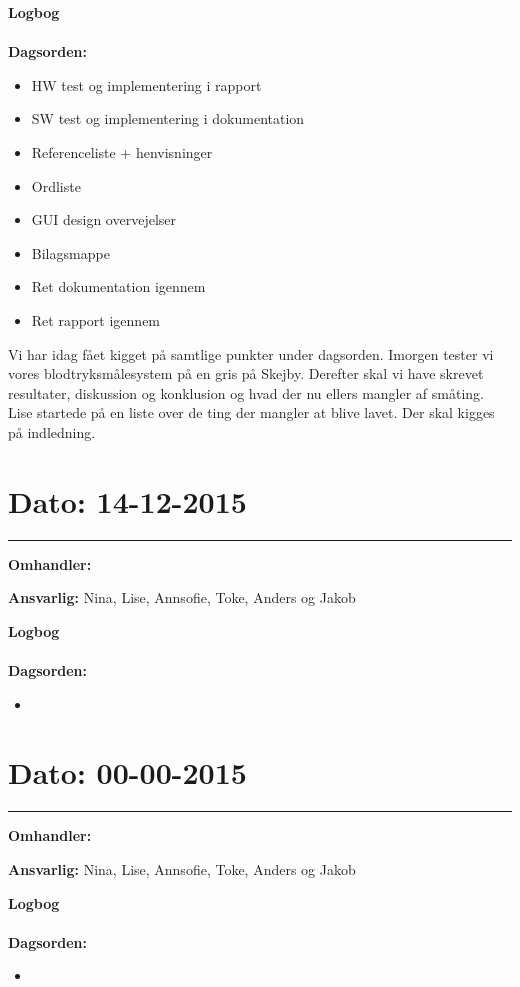 \textbf{Logbog}
\\
\\
\textbf{Dagsorden:}
\begin{itemize}
	\item HW test og implementering i rapport
	\item SW test og implementering i dokumentation
	\item Referenceliste + henvisninger
	\item Ordliste
	\item GUI design overvejelser
	\item Bilagsmappe
	\item Ret dokumentation igennem
	\item Ret rapport igennem
\end{itemize}

Vi har idag fået kigget på samtlige punkter under dagsorden.
Imorgen tester vi vores blodtryksmålesystem på en gris på Skejby.
Derefter skal vi have skrevet resultater, diskussion og konklusion og hvad der nu ellers mangler af småting. 
Lise startede på en liste over de ting der mangler at blive lavet. 
Der skal kigges på indledning.
	
	
	
	
\section{Dato: 14-12-2015 }
\hrule

\textbf{Omhandler:} 

\textbf{Ansvarlig:} Nina, Lise, Annsofie, Toke, Anders og Jakob

\textbf{Logbog}
\\
\\
\textbf{Dagsorden:}
\begin{itemize}
	\item 
\end{itemize}
	
	
	
	
\section{Dato: 00-00-2015 }
\hrule

\textbf{Omhandler:} 

\textbf{Ansvarlig:} Nina, Lise, Annsofie, Toke, Anders og Jakob

\textbf{Logbog}
\\
\\
\textbf{Dagsorden:}
\begin{itemize}
	\item 
\end{itemize}
